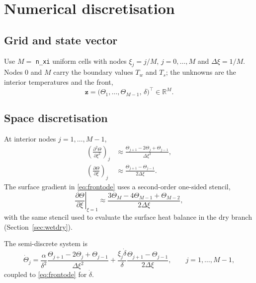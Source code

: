 \documentclass[11pt,a4paper]{article}
\newcommand{\pd}[2]{\frac{\partial #1}{\partial #2}}
\newcommand{\Ts}{T_s}
\newcommand{\Tw}{T_w}
\begin{document}
\section{Numerical discretisation}\label{sec:discretise}

\subsection{Grid and state vector}

Use $M=$ \texttt{n\_xi} uniform cells with nodes $\xi_j=j/M$, $j=0,\dots,M$ and
$\Delta\xi=1/M$. Nodes $0$ and $M$ carry the boundary values $\Tw$ and $\Ts$; the
unknowns are the interior temperatures and the front,
\begin{equation}
  \mathbf z=\big(\Theta_1,\dots,\Theta_{M-1},\,\delta\big)^{\!\top}\in\mathbb R^{M}.
\end{equation}

\subsection{Space discretisation}

At interior nodes $j=1,\dots,M-1$,
\begin{align}
  \left(\pd{^2\Theta}{\xi^2}\right)_j
   &\approx \frac{\Theta_{j+1}-2\Theta_j+\Theta_{j-1}}{\Delta\xi^2},\\
  \left(\pd{\Theta}{\xi}\right)_j
   &\approx \frac{\Theta_{j+1}-\Theta_{j-1}}{2\Delta\xi}.
\end{align}
The surface gradient in \eqref{eq:frontode} uses a second-order one-sided stencil,
\begin{equation}
  \left.\pd{\Theta}{\xi}\right|_{\xi=1}
  \approx \frac{3\Theta_M-4\Theta_{M-1}+\Theta_{M-2}}{2\Delta\xi},
\end{equation}
with the same stencil used to evaluate the surface heat balance in the dry branch
(Section~\ref{sec:wetdry}).

The semi-discrete system is
\begin{equation}
  \dot\Theta_j
  =\frac{\alpha}{\delta^2}
     \frac{\Theta_{j+1}-2\Theta_j+\Theta_{j-1}}{\Delta\xi^2}
   +\frac{\xi_j\dot\delta}{\delta}
     \frac{\Theta_{j+1}-\Theta_{j-1}}{2\Delta\xi},
  \qquad j=1,\dots,M-1,
\end{equation}
coupled to \eqref{eq:frontode} for $\dot\delta$.
\end{document}
